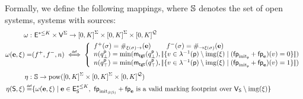 Formally, we define the following mappings, where
$\mathbb{S}$ denotes the set of open systems, \ie systems with
sources:
\begin{align*}
  \omega : & ~\mathsf{E}^{*\leq K} \times
  \mathsf{V}^\Sigma \rightarrow {[{0},{K}]}^\Sigma \times
  {[{0},{K}]}^\Sigma \times {[{0},{K}]}^\mathcal{Q} \\
  \omega(\mathbf{e},\xi) = & (f^+,f^-,n) \stackrel{\scriptscriptstyle{\mathsf{def}}}{\iff}
  \left\{\begin{array}{l} f^+(\sigma) =
  \#_{{\xi(\sigma)}\to}(\mathbf{e}) \hspace*{8mm} f^-(\sigma) =
  \#_{\to{\xi(\sigma)}}(\mathbf{e}) \\
  n(q^{\mathsf{p}}_\bot) = \min(\mathsf{m}_\mathsf{tgt}(q^{\mathsf{p}}_\bot), |\!|{{\{ {v\in\lambda^{-1}(\mathsf{p})
      \setminus {\mathrm{img}({\xi})} \mid
      (\mathsf{fp}_{\mathrm{init}_{\mathsf{p}}}+\mathsf{fp}_{\mathbf{e}})(v) = 0} \}}}|\!|) \\
  n(q^{\mathsf{p}}_\top) = \min(\mathsf{m}_\mathsf{tgt}(q^{\mathsf{p}}_\top),
  |\!|{{\{ {v\in\lambda^{-1}(\mathsf{p}) \setminus {\mathrm{img}({\xi})} \mid
      (\mathsf{fp}_{\mathrm{init}_{\mathsf{p}}}+\mathsf{fp}_{\mathbf{e}})(v) = 1} \}}}|\!|)
  \end{array}\right.
  \\[1mm]
  \eta : & ~\mathbb{S} \rightarrow {\mathrm{pow}({{[{0},{K}]}^\Sigma\times {[{0},{K}]}^\Sigma\times {[{0},{K}]}^\mathcal{Q}})} \\
  \eta(\mathsf{S},\xi) \stackrel{\scriptscriptstyle{\mathsf{def}}}{=} & {\{ {\omega(\mathbf{e},\xi) \mid \mathbf{e} \in \mathsf{E}_{\mathsf{S}}^{*\leq K},~ \mathsf{fp}_{\mathrm{init}_{\beta({\mathsf{S}})}}+\mathsf{fp}_{\mathbf{e}} \text{ is a valid marking footprint over } \mathsf{V}_{\mathsf{S}}\setminus{\mathrm{img}({\xi})}} \}}
\end{align*}

